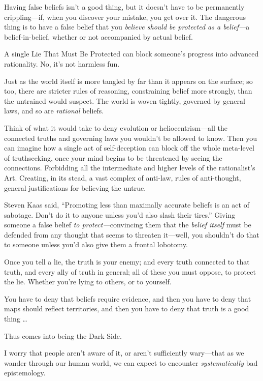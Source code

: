 {
 Having false beliefs isn't a good thing, but it
doesn't have to be permanently crippling---if, when you
discover your mistake, you get over it. The dangerous thing is to have
a false belief that you \textit{believe should be protected as a
belief---}a belief-in-belief, whether or not accompanied by actual
belief.}

{
 A single Lie That Must Be Protected can block
someone's progress into advanced rationality. No,
it's not harmless fun.}

{
 Just as the world itself is more tangled by far than it appears on
the surface; so too, there are stricter rules of reasoning,
constraining belief more strongly, than the untrained would suspect.
The world is woven tightly, governed by general laws, and so are
\textit{rational} beliefs.}

{
 Think of what it would take to deny evolution or
heliocentrism---all the connected truths and governing laws you
wouldn't be allowed to know. Then you can imagine how a
single act of self-deception can block off the whole meta-level of
truthseeking, once your mind begins to be threatened by seeing the
connections. Forbidding all the intermediate and higher levels of the
rationalist's Art. Creating, in its stead, a vast
complex of anti-law, rules of anti-thought, general justifications for
believing the untrue.}

{
 Steven Kaas said, ``Promoting less than maximally
accurate beliefs is an act of sabotage. Don't do it to
anyone unless you'd also slash their
tires.'' Giving someone a false belief \textit{to
protect---}convincing them that the \textit{belief itself} must be
defended from any thought that seems to threaten it---well, you
shouldn't do that to someone unless
you'd also give them a frontal lobotomy.}

{
 Once you tell a lie, the truth is your enemy; and every truth
connected to that truth, and every ally of truth in general; all of
these you must oppose, to protect the lie. Whether
you're lying to others, or to yourself.}

{
 You have to deny that beliefs require evidence, and then you have
to deny that maps should reflect territories, and then you have to deny
that truth is a good thing \ldots}

{
 Thus comes into being the Dark Side.}

{
 I worry that people aren't aware of it, or
aren't sufficiently wary---that as we wander through
our human world, we can expect to encounter \textit{systematically} bad
epistemology.}

